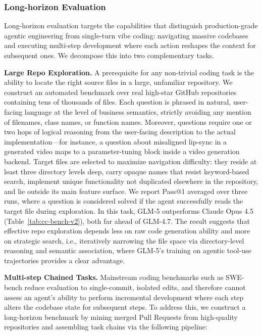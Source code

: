 \documentclass{article}
\theoremstyle{definition}
\begin{document}
\subsubsection{Long-horizon Evaluation}

Long-horizon evaluation targets the capabilities that distinguish production-grade agentic engineering from single-turn vibe coding: navigating massive codebases and executing multi-step development where each action reshapes the context for subsequent ones. We decompose this into two complementary tasks.

\textbf{Large Repo Exploration.} A prerequisite for any non-trivial coding task is the ability to locate the right source files in a large, unfamiliar repository. We construct an automated benchmark over real high-star GitHub repositories containing tens of thousands of files. Each question is phrased in natural, user-facing language at the level of business semantics, strictly avoiding any mention of filenames, class names, or function names. Moreover, questions require one or two hops of logical reasoning from the user-facing description to the actual implementation---for instance, a question about misaligned lip-sync in a generated video maps to a parameter-tuning block inside a video generation backend. Target files are selected to maximize navigation difficulty: they reside at least three directory levels deep, carry opaque names that resist keyword-based search, implement unique functionality not duplicated elsewhere in the repository, and lie outside its main feature surface. We report Pass@1 averaged over three runs, where a question is considered solved if the agent successfully reads the target file during exploration. In this task, GLM-5 outperforms Claude Opus 4.5 (Table~\ref{tab:cc-bench-v2}), both far ahead of GLM-4.7. The result suggests that effective repo exploration depends less on raw code generation ability and more on strategic search, i.e., iteratively narrowing the file space via directory-level reasoning and semantic association, where GLM-5's training on agentic tool-use trajectories provides a clear advantage.

\textbf{Multi-step Chained Tasks.} Mainstream coding benchmarks such as SWE-bench reduce evaluation to single-commit, isolated edits, and therefore cannot assess an agent's ability to perform incremental development where each step alters the codebase state for subsequent steps. To address this, we construct a long-horizon benchmark by mining merged Pull Requests from high-quality repositories and assembling task chains via the following pipeline:
\end{document}
